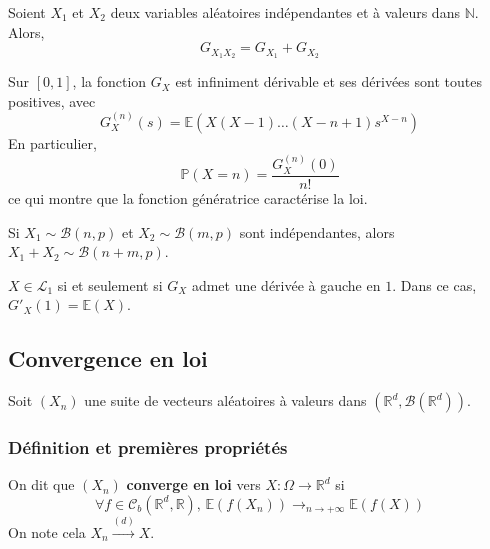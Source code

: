   \begin{proposition}
    Soient $X_1$ et $X_2$ deux variables aléatoires indépendantes et à valeurs dans $\mathbb{N}$. Alors,
    \[ G_{X_1 X_2} = G_{X_1} + G_{X_2} \]
  \end{proposition}

  \begin{theorem}
    Sur $[0,1]$, la fonction $G_X$ est infiniment dérivable et ses dérivées sont toutes positives, avec
    \[ G_X^{(n)}(s) = \mathbb{E}(X(X-1) \dots (X-n+1)s^{X-n}) \]
    En particulier,
    \[ \mathbb{P}(X=n) = \frac{G_X^{(n)}(0)}{n!} \]
    ce qui montre que la fonction génératrice caractérise la loi.
  \end{theorem}


  \begin{example}
    Si $X_1 \sim \mathcal{B}(n, p)$ et $X_2 \sim \mathcal{B}(m, p)$ sont indépendantes, alors $X_1 + X_2 \sim \mathcal{B}(n + m, p)$.
  \end{example}


  \begin{theorem}
    $X \in \mathcal{L}_1$ si et seulement si $G_X$ admet une dérivée à gauche en $1$. Dans ce cas, $G'_X(1) = \mathbb{E}(X)$.
  \end{theorem}

  \subsection{Convergence en loi}

  Soit $(X_n)$ une suite de vecteurs aléatoires à valeurs dans $(\mathbb{R}^d, \mathcal{B}(\mathbb{R}^d))$.

  \subsubsection{Définition et premières propriétés}


  \begin{definition}
    On dit que $(X_n)$ \textbf{converge en loi} vers $X : \Omega \rightarrow \mathbb{R}^d$ si
    \[ \forall f \in \mathcal{C}_b(\mathbb{R}^d, \mathbb{R}), \, \mathbb{E}(f(X_n)) \longrightarrow_{n \rightarrow +\infty} \mathbb{E}(f(X)) \]
    On note cela $X_n \overset{(d)}{\longrightarrow} X$.
  \end{definition}

